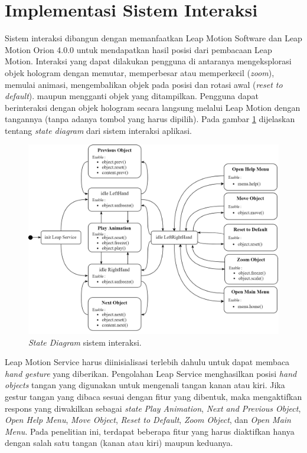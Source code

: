 \section{Implementasi Sistem Interaksi} \label{section:implementasi_interaksi}
\vspace{1ex}
	Sistem interaksi dibangun dengan memanfaatkan Leap Motion Software dan Leap Motion Orion 4.0.0 untuk mendapatkan hasil posisi dari pembacaan Leap Motion. Interaksi yang dapat dilakukan pengguna di antaranya mengeksplorasi objek hologram dengan memutar, memperbesar atau memperkecil (\textit{zoom}), memulai animasi, mengembalikan objek pada posisi dan rotasi awal (\textit{reset to default}). maupun mengganti objek yang ditampilkan. Pengguna dapat berinteraksi dengan objek hologram secara langsung melalui Leap Motion dengan tangannya (tanpa adanya tombol yang harus dipilih). Pada gambar \ref{fig:statediagram_interaksi} dijelaskan tentang \textit{state diagram} dari sistem interaksi aplikasi. 
	\begin{figure} [H]
		\includegraphics[width=\textwidth]{img/bab3/statediagram_interaksi.png}
		\caption{\textit{State Diagram} sistem interaksi.}
		\label{fig:statediagram_interaksi}
	\end{figure}
	\vspace{-2ex}

	Leap Motion Service harus diinisialisasi terlebih dahulu untuk dapat membaca \textit{hand gesture} yang diberikan. Pengolahan Leap Service menghasilkan posisi \textit{hand objects} tangan yang digunakan untuk mengenali tangan kanan atau kiri. Jika gestur tangan yang dibaca sesuai dengan fitur yang dibentuk, maka mengaktifkan respons yang diwakilkan sebagai \textit{state} \textit{Play Animation}, \textit{Next and Previous Object}, \textit{Open Help Menu}, \textit{Move Object}, \textit{Reset to Default}, \textit{Zoom Object}, dan \textit{Open Main Menu}. Pada penelitian ini, terdapat beberapa fitur yang harus diaktifkan hanya dengan salah satu tangan (kanan atau kiri) maupun keduanya.
\vspace{1.5ex}
	
